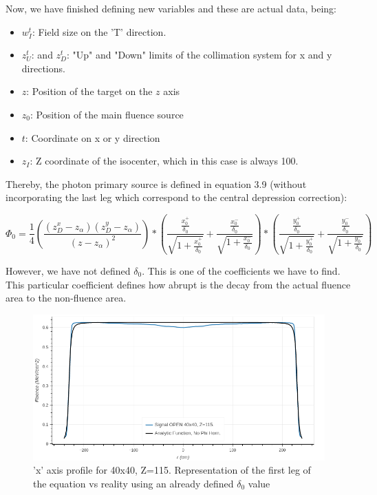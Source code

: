 \documentclass[openany]{article}
\begin{document}
\newpage


Now, we have finished defining new variables and these are actual data, being:

\begin{itemize}
    \item \(w_I^t\): Field size on the 'T' direction. 
    \item \(z_U^t\): and \(z_D^t\): "Up" and "Down" limits of the collimation system for x and y directions.
    \item \(z\): Position of the target on the \(z\) axis
    \item \(z_0\): Position of the main fluence source
    \item \(t\): Coordinate on x or y direction 
    \item \(z_I\): Z coordinate of the isocenter, which in this case is always 100.

    
\end{itemize}



Thereby, the photon primary source is defined in equation 3.9 (without incorporating the last leg which correspond to the central depression correction):

\begin{equation}
    \Phi_0 = \frac{1}{4} (\frac{(z_D^x - z_\alpha) (z^y_D - z_\alpha )}{(z-z_\alpha)^2})*(\frac{\frac{x_0^+}{\delta_0}}{\sqrt{1+\frac{x_0^+}{\delta_0}}} + \frac{\frac{x_0^-}{\delta_0}}{\sqrt{1+\frac{x_0^-}{\delta_0}}}) * (\frac{\frac{y_0^+}{\delta_0}}{\sqrt{1+\frac{y_0^+}{\delta_0}}} + \frac{\frac{y_0^-}{\delta_0}}{\sqrt{1+\frac{y_0^-}{\delta_0}}})
\end{equation}

However, we have not defined \(\delta_0\). This is one of the coefficients we have to find. This particular coefficient defines how abrupt is the decay from the actual fluence area to the non-fluence area.

\begin{figure}[!h]
    \centering
    \includegraphics[width=\textwidth]{NoCentralDepression.png}
    \caption{'x' axis profile for 40x40, Z=115. Representation of the first leg of the equation vs reality using an already defined \(\delta_0\) value}
    \label{fig:my_label}
\end{figure}
\end{document}
